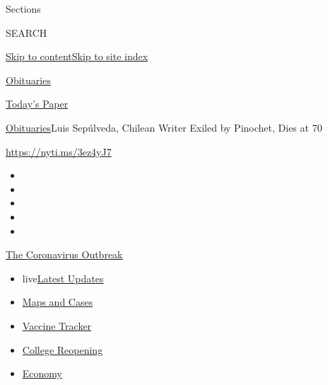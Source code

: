 Sections

SEARCH

\protect\hyperlink{site-content}{Skip to
content}\protect\hyperlink{site-index}{Skip to site index}

\href{https://www.nytimes.com/section/obituaries}{Obituaries}

\href{https://myaccount.nytimes.com/auth/login?response_type=cookie\&client_id=vi}{}

\href{https://www.nytimes.com/section/todayspaper}{Today's Paper}

\href{/section/obituaries}{Obituaries}\textbar{}Luis Sepúlveda, Chilean
Writer Exiled by Pinochet, Dies at 70

\url{https://nyti.ms/3ez4yJ7}

\begin{itemize}
\item
\item
\item
\item
\item
\end{itemize}

\href{https://www.nytimes.com/news-event/coronavirus?action=click\&pgtype=Article\&state=default\&region=TOP_BANNER\&context=storylines_menu}{The
Coronavirus Outbreak}

\begin{itemize}
\tightlist
\item
  live\href{https://www.nytimes.com/2020/08/03/world/coronavirus-covid-19.html?action=click\&pgtype=Article\&state=default\&region=TOP_BANNER\&context=storylines_menu}{Latest
  Updates}
\item
  \href{https://www.nytimes.com/interactive/2020/us/coronavirus-us-cases.html?action=click\&pgtype=Article\&state=default\&region=TOP_BANNER\&context=storylines_menu}{Maps
  and Cases}
\item
  \href{https://www.nytimes.com/interactive/2020/science/coronavirus-vaccine-tracker.html?action=click\&pgtype=Article\&state=default\&region=TOP_BANNER\&context=storylines_menu}{Vaccine
  Tracker}
\item
  \href{https://www.nytimes.com/2020/08/02/us/covid-college-reopening.html?action=click\&pgtype=Article\&state=default\&region=TOP_BANNER\&context=storylines_menu}{College
  Reopening}
\item
  \href{https://www.nytimes.com/live/2020/08/03/business/stock-market-today-coronavirus?action=click\&pgtype=Article\&state=default\&region=TOP_BANNER\&context=storylines_menu}{Economy}
\end{itemize}

